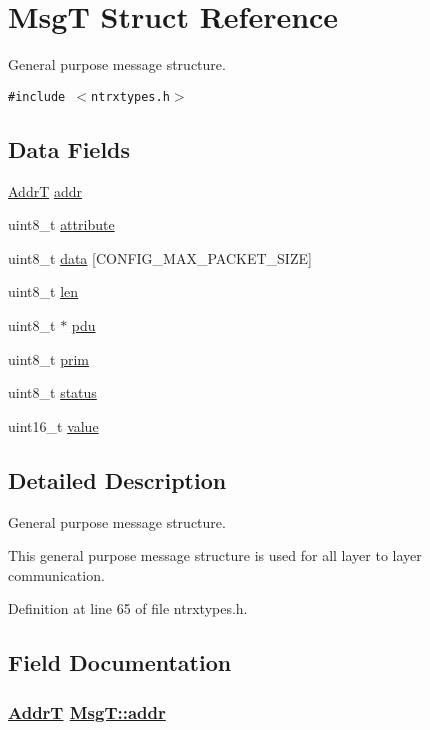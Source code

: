 \hypertarget{structMsgT}{
\section{Msg\-T Struct Reference}
\label{structMsgT}
}
General purpose message structure.  


{\tt \#include $<$ntrxtypes.h$>$}

\subsection*{Data Fields}
\begin{CompactItemize}
\item 
\hyperlink{ntrxtypes_8h_9763ea343e88d0129a49347a4b2ff676}{Addr\-T} \hyperlink{structMsgT_c43159f8e7d6a971e0e1e8dc7d5a6701}{addr}
\item 
uint8\_\-t \hyperlink{structMsgT_2490adcea73235248c0644d0f0d5617f}{attribute}
\item 
uint8\_\-t \hyperlink{structMsgT_cceb12b48d6e524a880c2c11d399b1b6}{data} \mbox{[}CONFIG\_\-MAX\_\-PACKET\_\-SIZE\mbox{]}
\item 
uint8\_\-t \hyperlink{structMsgT_5edfff063e0b30b685cd4aa81dc04812}{len}
\item 
uint8\_\-t $\ast$ \hyperlink{structMsgT_7c3e54fb06475cb6a34d09820d59eeb1}{pdu}
\item 
uint8\_\-t \hyperlink{structMsgT_c5e6312583b2581386a17ee7ced2656f}{prim}
\item 
uint8\_\-t \hyperlink{structMsgT_f1e6d2725308055637fbed518de493a8}{status}
\item 
uint16\_\-t \hyperlink{structMsgT_86aa9f2d1fc5ea4ebec6b7415e28c1a9}{value}
\end{CompactItemize}


\subsection{Detailed Description}
General purpose message structure. 

This general purpose message structure is used for all layer to layer communication. 



Definition at line 65 of file ntrxtypes.h.

\subsection{Field Documentation}
\hypertarget{structMsgT_c43159f8e7d6a971e0e1e8dc7d5a6701}{
\subsubsection[addr]{\setlength{\rightskip}{0pt plus 5cm}\hyperlink{ntrxtypes_8h_9763ea343e88d0129a49347a4b2ff676}{Addr\-T} \hyperlink{structMsgT_c43159f8e7d6a971e0e1e8dc7d5a6701}{Msg\-T::addr}}}
\label{structMsgT_c43159f8e7d6a971e0e1e8dc7d5a6701}


